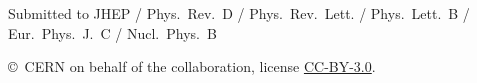 \begin{titlepage}
\vspace*{2.0cm}

\begin{center}
  Submitted to JHEP / Phys.~Rev.~D / Phys.~Rev.~Lett. / Phys.~Lett.~B / Eur.~Phys.~J.~C / Nucl.~Phys.~B 
\end{center}

\vspace{\fill}

{\footnotesize 
\centerline{\copyright~CERN on behalf of the \lhcb collaboration, license \href{http://creativecommons.org/licenses/by/3.0/}{CC-BY-3.0}.}}
\vspace*{2mm}

\end{titlepage}



\newpage
\setcounter{page}{2}
\mbox{~}
\newpage


\cleardoublepage







